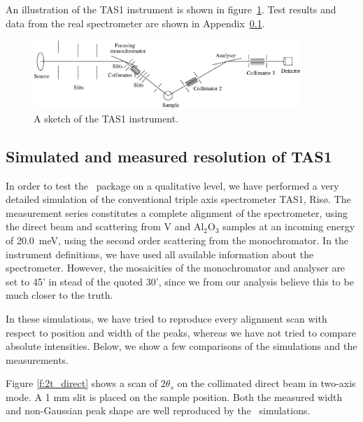 An illustration of the TAS1 instrument
is shown in figure~\ref{f:TAS1}.
Test results and data from the real spectrometer are shown
in Appendix~\ref{data:TAS1}. 

\begin{figure}
  \begin{center}
    \includegraphics[width=0.9\textwidth]{figures/tas1.eps}
  \end{center}
\caption{A sketch of the TAS1 instrument.}
\label{f:TAS1}
\end{figure}

\subsection{Simulated and measured resolution of TAS1}
\label{data:TAS1}

In order to test the \MCS\ package on a qualitative level,
we have performed a very detailed simulation of the conventional
triple axis spectrometer TAS1, Ris\o . The measurement series
constitutes a complete alignment of the spectrometer,
using the direct beam and scattering from V and Al$_2$O$_3$
samples at an incoming energy of 20.0~meV, using the second order
scattering from the monochromator. 
In the instrument definitions, we have used all available
information about the spectrometer. However, the
mosaicities of the monochromator and analyser are set
to 45' in stead of the quoted 30', since we from our
analysis believe this to be much closer to the truth.

In these simulations, we have tried to reproduce
every alignment scan with respect to position and width
of the peaks, whereas we have not tried to compare
absolute intensities. Below, we show a few comparisons 
of the simulations and the measurements. 

Figure \ref{f:2t_direct} shows a scan of 
$2\theta_s$ on the collimated direct beam in two-axis mode.
A 1 mm slit is placed on the sample position.
Both the measured width and non-Gaussian peak shape
are well reproduced by the \MCS\ simulations.

